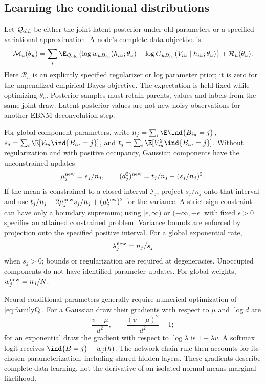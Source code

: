 \subsection{Learning the conditional distributions}
\label{sec:familymstep}
Let \(\mathcal Q_{\rm old}\) be either the joint latent posterior under
old parameters or a specified variational approximation. A node's
complete-data objective is
\begin{equation}\label{eq:familyQ}
\mathcal M_u(\theta_u)=
\sum_i\E_{\mathcal Q_{\rm old}}
\{\log w_{uB_{iu}}(h_{iu};\theta_u)
+\log G_{uB_{iu}}(V_{iu}\mid h_{iu};\theta_u)\}
+\mathcal R_u(\theta_u).
\end{equation}
Here \(\mathcal R_u\) is an explicitly specified regularizer or log
parameter prior; it is zero for the unpenalized empirical-Bayes objective.
The expectation is held fixed while optimizing \(\theta_u\).
Posterior samples must retain parents, values and labels from the same
joint draw. Latent posterior values are not new noisy observations for
another EBNM deconvolution step.

For global component parameters, write
\(n_j=\sum_i\E\ind\{B_{iu}=j\}\),
\(s_j=\sum_i\E[V_{iu}\ind\{B_{iu}=j\}]\), and
\(t_j=\sum_i\E[V_{iu}^2\ind\{B_{iu}=j\}]\).
Without regularization and with positive occupancy, Gaussian components
have the unconstrained updates
\begin{equation}\label{eq:familygaussmstep}
\mu_j^{\rm new}=s_j/n_j,\qquad
(d_j^2)^{\rm new}=t_j/n_j-(s_j/n_j)^2.
\end{equation}
If the mean is constrained to a closed interval \(\mathcal I_j\), project
\(s_j/n_j\) onto that interval and use
\(t_j/n_j-2\mu_j^{\rm new}s_j/n_j+(\mu_j^{\rm new})^2\)
for the variance. A strict sign constraint can have only a boundary
supremum; using \([\epsilon,\infty)\) or \((-\infty,-\epsilon]\)
with fixed \(\epsilon>0\) specifies an attained constrained problem.
Variance bounds are enforced by projection onto the specified positive
interval. For a global exponential rate,
\begin{equation}\label{eq:familyexpmstep}
\lambda_j^{\rm new}=n_j/s_j
\end{equation}
when \(s_j>0\); bounds or regularization are required at degeneracies.
Unoccupied components do not have identified parameter updates.
For global weights, \(w_j^{\rm new}=n_j/N\).

Neural conditional parameters generally require numerical optimization of
\eqref{eq:familyQ}. For a Gaussian draw their gradients with respect to
\(\mu\) and \(\log d\) are
\[
\frac{v-\mu}{d^2},\qquad \frac{(v-\mu)^2}{d^2}-1;
\]
for an exponential draw the gradient with respect to \(\log\lambda\)
is \(1-\lambda v\). A softmax logit receives
\(\ind\{B=j\}-w_j(h)\). The network chain rule then accounts for its
chosen parameterization, including shared hidden layers. These gradients
describe complete-data learning, not the derivative of an isolated
normal-means marginal likelihood.

